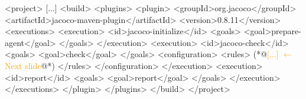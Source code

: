\documentclass{article}
\begin{document}


\begin{multicols}{2}
{\tiny\begin{ffcode}
<project>
  [...]
  <build>
    <plugins>
      <plugin>
        <groupId>org.jacoco</groupId>
        <artifactId>jacoco-maven-plugin</artifactId>
        <version>0.8.11</version>
        <executions>
          <execution>
            <id>jacoco-initialize</id>
            <goals>
              <goal>prepare-agent</goal>
            </goals>
          </execution>
          <execution>
            <id>jacoco-check</id>
            <goals>
              <goal>check</goal>
            </goals>
            <configuration>
              <rules>
                (*@\textcolor{orange}{[...] \(\leftarrow\) Next slide}@*)
              </rules>
            </configuration>
          </execution>
          <execution>
            <id>report</id>
            <goals>
              <goal>report</goal>
            </goals>
          </execution>
        </executions>
      </plugin>
    </plugins>
  </build>
</project>
\end{ffcode}
}
\end{multicols}
\plush{}
\end{document}
